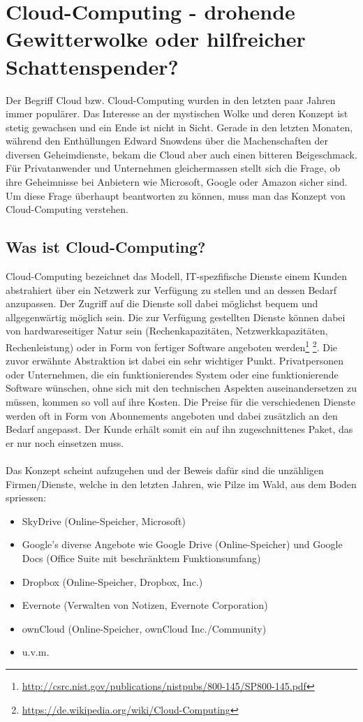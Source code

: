 \newpage
\section{Cloud-Computing - drohende Gewitterwolke oder hilfreicher Schattenspender?}
Der Begriff Cloud bzw. Cloud-Computing wurden in den letzten paar Jahren immer populärer. Das Interesse an der mystischen Wolke und deren Konzept ist stetig gewachsen und ein Ende ist nicht in Sicht. Gerade in den letzten Monaten, während den Enthüllungen Edward Snowdens über die Machenschaften der diversen Geheimdienste, bekam die Cloud aber auch einen bitteren Beigeschmack. Für Privatanwender und Unternehmen gleichermassen stellt sich die Frage, ob ihre Geheimnisse bei Anbietern wie Microsoft, Google oder Amazon sicher sind. Um diese Frage überhaupt beantworten zu können, muss man das Konzept von Cloud-Computing verstehen.

\subsection{Was ist Cloud-Computing?}
Cloud-Computing bezeichnet das Modell, IT-spezfifische Dienste einem Kunden abstrahiert über ein Netzwerk zur Verfügung zu stellen und an dessen Bedarf anzupassen. Der Zugriff auf die Dienste soll dabei möglichst bequem und allgegenwärtig möglich sein. Die zur Verfügung gestellten Dienste können dabei von hardwareseitiger Natur sein (Rechenkapazitäten, Netzwerkkapazitäten, Rechenleistung) oder in Form von fertiger Software angeboten werden\footnote{\url{http://csrc.nist.gov/publications/nistpubs/800-145/SP800-145.pdf}} \footnote{\url{https://de.wikipedia.org/wiki/Cloud-Computing}}.
Die zuvor erwähnte Abstraktion ist dabei ein sehr wichtiger Punkt. Privatpersonen oder Unternehmen, die ein funktionierendes System oder eine funktionierende Software wünschen, ohne sich mit den technischen Aspekten auseinandersetzen zu müssen, kommen so voll auf ihre Kosten. Die Preise für die verschiedenen Dienste werden oft in Form von Abonnements angeboten und dabei zusätzlich an den Bedarf angepasst. Der Kunde erhält somit ein auf ihn zugeschnittenes Paket, das er nur noch einsetzen muss.
\\
\\
Das Konzept scheint aufzugehen und der Beweis dafür sind die unzähligen Firmen/Dienste, welche in den letzten Jahren, wie Pilze im Wald, aus dem Boden spriessen:
\begin{itemize}
\item SkyDrive (Online-Speicher, Microsoft)
\item Google's diverse Angebote wie Google Drive (Online-Speicher) und Google Docs (Office Suite mit beschränktem Funktionsumfang)
\item Dropbox (Online-Speicher, Dropbox, Inc.)
\item Evernote (Verwalten von Notizen, Evernote Corporation)
\item ownCloud (Online-Speicher, ownCloud Inc./Community)
\item u.v.m.
\end{itemize}

